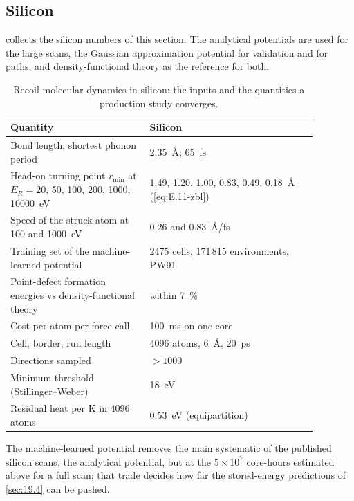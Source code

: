 \subsection{Silicon}

 collects the silicon numbers of this section. The analytical potentials are used for the large scans, the Gaussian approximation potential for validation and for paths, and density-functional theory as the reference for both.

\begin{table}[t]
  \caption{Recoil molecular dynamics in silicon: the inputs and the quantities a production study converges.}
  \label{tab:E-md-si}
  \centering
  \begin{tabular}{p{0.40\linewidth}p{0.48\linewidth}}
    \toprule
    Quantity & Silicon \\
    \midrule
    Bond length; shortest phonon period & \SI{2.35}{\angstrom}; \SI{65}{fs} \\
    Head-on turning point $r_{\mathrm{min}}$ at $E_R = 20$, 50, 100, 200, 1000, \SI{10000}{eV} & 1.49, 1.20, 1.00, 0.83, 0.49, \SI{0.18}{\angstrom} (\cref{eq:E.11-zbl}) \\
    Speed of the struck atom at 100 and \SI{1000}{eV} & 0.26 and \SI{0.83}{\angstrom/fs} \\
    Training set of the machine-learned potential & 2475 cells, 171\,815 environments, PW91~\cite{bartok2018machine} \\
    Point-defect formation energies vs density-functional theory & within \SI{7}{\percent}~\cite{bartok2018machine} \\
    Cost per atom per force call & \SI{100}{ms} on one core~\cite{bartok2018machine} \\
    Cell, border, run length & 4096 atoms, \SI{6}{\angstrom}, \SI{20}{ps}~\cite{sassi2022energy} \\
    Directions sampled & $> 1000$~\cite{sassi2022energy} \\
    Minimum threshold (Stillinger--Weber) & \SI{18}{eV}~\cite{sassi2022energy} \\
    Residual heat per K in 4096 atoms & \SI{0.53}{eV} (equipartition) \\
    \bottomrule
  \end{tabular}
\end{table}

The machine-learned potential removes the main systematic of the published silicon scans, the analytical potential, but at the $5\times10^7$ core-hours estimated above for a full scan; that trade decides how far the stored-energy predictions of \cref{sec:19.4} can be pushed.
